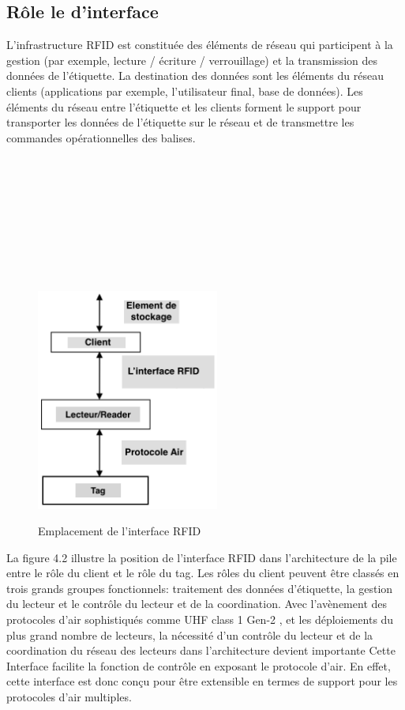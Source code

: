 \documentclass[11pt, a4paper, twoside]{book}
\begin{document}
\subsection{Rôle le d'interface}
L'infrastructure RFID est constituée des éléments de réseau qui participent à la gestion (par exemple, lecture / écriture / verrouillage) et la transmission des données de l'étiquette. La destination des données sont les éléments du réseau clients (applications par exemple, l'utilisateur final, base de données). Les éléments du réseau entre l'étiquette et les clients forment le support pour transporter les données de l'étiquette sur le réseau et de transmettre les commandes opérationnelles des balises.\\\\\\\\\\\\\\\\\\
\begin{figure}[H]
\centering
\includegraphics[width=6cm,height=8cm]{orga}
\caption{Emplacement de l'interface RFID}
\end{figure}

La figure 4.2 illustre la position de l'interface RFID dans l'architecture de la pile entre le  rôle  du client  et le rôle du tag. Les rôles du client peuvent être classés en trois grands groupes fonctionnels: traitement des données d'étiquette, la gestion du lecteur et le contrôle du lecteur et de la coordination. Avec l'avènement des protocoles d'air sophistiqués comme UHF class 1 Gen-2 \cite{air}, et les déploiements du plus grand nombre de lecteurs, la nécessité d'un contrôle du lecteur et de la coordination  du réseau des lecteurs dans l'architecture devient importante
Cette Interface  facilite la fonction de contrôle en exposant le protocole d'air. En effet, cette interface est donc conçu pour être extensible en termes de support pour les protocoles d'air multiples.\\
\end{document}
